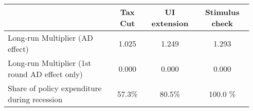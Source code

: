 \begin{tabular}{@{}lccc@{}} 
\toprule 
& Tax Cut    & UI extension    & Stimulus check    \\  \midrule 
Long-run Multiplier (AD effect) &1.025  & 1.249  & 1.293     \\ 
Long-run Multiplier (1st round AD effect only) &0.000  & 0.000  & 0.000     \\ 
Share of policy expenditure during recession &57.3\%  & 80.5\%  & 100.0 \%    \\ 
\end{tabular}  

